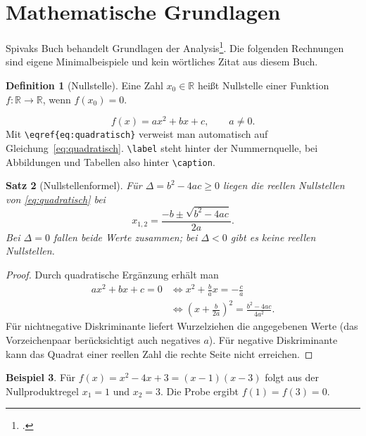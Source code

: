\documentclass[12pt,a4paper,ngerman]{scrartcl}
\newtheorem{satz}{Satz}[section]
\theoremstyle{definition}
\newtheorem{definition}[satz]{Definition}
\newtheorem{beispiel}[satz]{Beispiel}
\begin{document}
\section{Mathematische Grundlagen}
\label{sec:grundlagen}
Spivaks Buch behandelt Grundlagen der Analysis\footcite{spivak2008}. Die folgenden Rechnungen sind eigene
Minimalbeispiele und kein wörtliches Zitat aus diesem Buch.

\begin{definition}[Nullstelle]
  Eine Zahl \(x_0\in\mathbb{R}\) heißt Nullstelle einer Funktion
  \(f\colon\mathbb{R}\to\mathbb{R}\), wenn \(f(x_0)=0\).
\end{definition}

\begin{equation}
  f(x)=ax^2+bx+c, \qquad a\neq 0.
  \label{eq:quadratisch}
\end{equation}
Mit \verb|\eqref{eq:quadratisch}| verweist man automatisch auf
Gleichung~\eqref{eq:quadratisch}. \verb|\label| steht hinter der Nummernquelle,
bei Abbildungen und Tabellen also hinter \verb|\caption|.

\begin{satz}[Nullstellenformel]
  Für \(\Delta=b^2-4ac\geq 0\) liegen die reellen Nullstellen von
  \eqref{eq:quadratisch} bei
  \[
    x_{1,2}=\frac{-b\pm\sqrt{b^2-4ac}}{2a}.
  \]
  Bei \(\Delta=0\) fallen beide Werte zusammen; bei \(\Delta<0\)
  gibt es keine reellen Nullstellen.
\end{satz}
\begin{proof}
  Durch quadratische Ergänzung erhält man
  \begin{align*}
    ax^2+bx+c=0
      &\iff x^2+\frac{b}{a}x=-\frac{c}{a} \\
      &\iff \left(x+\frac{b}{2a}\right)^2
              =\frac{b^2-4ac}{4a^2}.
  \end{align*}
  Für nichtnegative Diskriminante liefert Wurzelziehen die angegebenen Werte
  (das Vorzeichenpaar berücksichtigt auch negatives \(a\)). Für negative
  Diskriminante kann das Quadrat einer reellen Zahl die rechte Seite nicht erreichen.
\end{proof}

\begin{beispiel}
  Für \(f(x)=x^2-4x+3=(x-1)(x-3)\) folgt aus der Nullproduktregel
  \(x_1=1\) und \(x_2=3\). Die Probe ergibt \(f(1)=f(3)=0\).
\end{beispiel}
\end{document}
